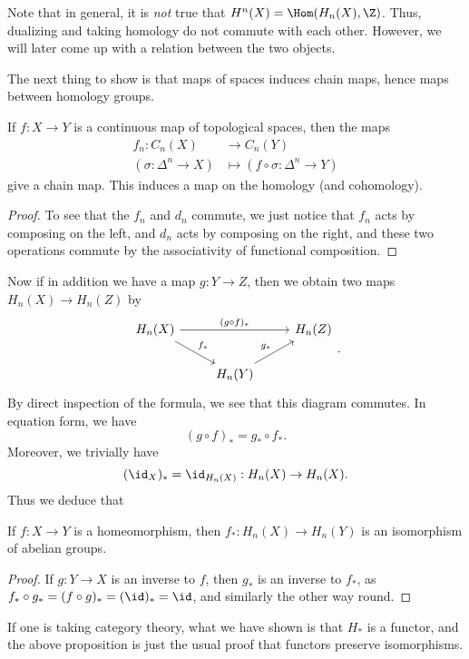 \documentclass[a4paper]{article}
\begin{document}
Note that in general, it is \emph{not} true that $H^n(X) = \Hom(H_n(X), \Z)$. Thus, dualizing and taking homology do not commute with each other. However, we will later come up with a relation between the two objects.

The next thing to show is that maps of spaces induces chain maps, hence maps between homology groups.

\begin{prop}
  If $f: X \to Y$ is a continuous map of topological spaces, then the maps
  \begin{align*}
    f_n: C_n(X) &\to C_n(Y)\\
    (\sigma: \Delta^n \to X) &\mapsto (f \circ \sigma: \Delta^n \to Y)
  \end{align*}
  give a chain map. This induces a map on the homology (and cohomology).
\end{prop}

\begin{proof}
  To see that the $f_n$ and $d_n$ commute, we just notice that $f_n$ acts by composing on the left, and $d_n$ acts by composing on the right, and these two operations commute by the associativity of functional composition.
\end{proof}

Now if in addition we have a map $g: Y \to Z$, then we obtain two maps $H_n(X) \to H_n(Z)$ by
\[
  \begin{tikzcd}
    H_n(X) \ar[rr, "(g \circ f)_*"] \ar[rd, "f_*"] & & H_n(Z)\\
    & H_n(Y) \ar[ru, "g_*"]
  \end{tikzcd}.
\]
By direct inspection of the formula, we see that this diagram commutes. In equation form, we have
\[
  (g \circ f)_* = g_* \circ f_*.
\]
Moreover, we trivially have
\[
  (\id_X)_* = \id_{H_n(X)}: H_n(X) \to H_n(X).
\]
Thus we deduce that
\begin{prop}
  If $f: X \to Y$ is a homeomorphism, then $f_*: H_n(X) \to H_n(Y)$ is an isomorphism of abelian groups.
\end{prop}

\begin{proof}
  If $g: Y \to X$ is an inverse to $f$, then $g_*$ is an inverse to $f_*$, as $f_* \circ g_* = (f \circ g)_* = (\id)_* = \id$, and similarly the other way round.
\end{proof}
If one is taking category theory, what we have shown is that $H_*$ is a functor, and the above proposition is just the usual proof that functors preserve isomorphisms.
\end{document}
